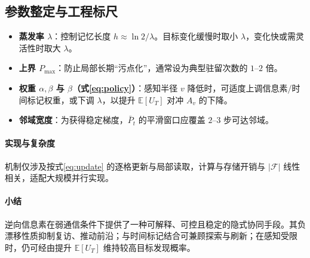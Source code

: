 \subsection{参数整定与工程标尺}
\begin{itemize}
    \item \textbf{蒸发率 $\lambda$}：控制记忆长度 $h\approx\ln 2/\lambda$。目标变化缓慢时取小 $\lambda$，变化快或需灵活性时取大 $\lambda$。
    \item \textbf{上界 $P_{\max}$}：防止局部长期“污点化”，通常设为典型驻留次数的 $1$–$2$ 倍。
    \item \textbf{权重 $\alpha,\beta$ 与 $\beta$（式\eqref{eq:policy}）}：感知半径 $v$ 降低时，可适度上调信息素/时间标记权重，或下调 $\lambda$，以提升 $\mathbb{E}[U_T]$ 对冲 $A_v$ 的下降。
    \item \textbf{邻域宽度}：为获得稳定梯度，$\bar{P}_t$ 的平滑窗口应覆盖 $2$–$3$ 步可达邻域。
\end{itemize}

\paragraph{实现与复杂度} 机制仅涉及按式\eqref{eq:update} 的逐格更新与局部读取，计算与存储开销与 $\lvert\mathcal{F}\rvert$ 线性相关，适配大规模并行实现。

\paragraph{小结} 逆向信息素在弱通信条件下提供了一种可解释、可控且稳定的隐式协同手段。其负漂移性质抑制复访、推动前沿；与时间标记结合可兼顾探索与刷新；在感知受限时，仍可经由提升 $\mathbb{E}[U_T]$ 维持较高目标发现概率。